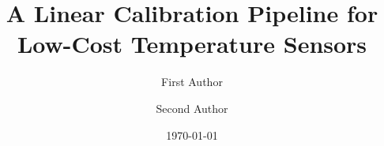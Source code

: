 %
%
%
\documentclass[10pt,twocolumn]{article}



\title{A Linear Calibration Pipeline for Low-Cost Temperature Sensors}

\author[1]{First Author}
\author[1]{Second Author}

\date{\today}


\twocolumn[
\begin{@twocolumnfalse}
\maketitle


\end{@twocolumnfalse}
]

